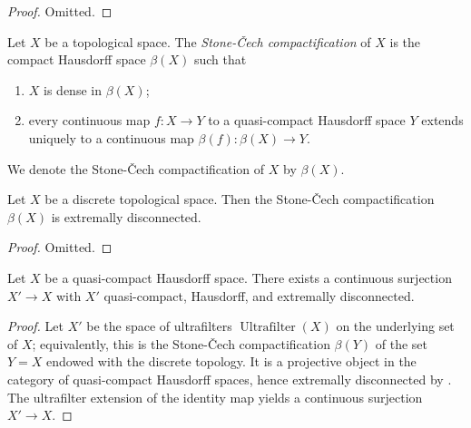 \begin{proof}
  \mathlibok
  \leanok
  Omitted.
\end{proof}

\begin{definition} 
  \label{def:stone-cech-compactification}
  \mathlibok
  \leanok
  Let \(X\) be a topological space. The \emph{Stone-Čech compactification} of \(X\) is the
  compact Hausdorff space \(\beta(X)\) such that
  \begin{enumerate}
    \item \(X\) is dense in \(\beta(X)\);
    \item every continuous map \(f: X \to Y\) to a quasi-compact Hausdorff space \(Y\)
        extends uniquely to a continuous map \(\beta(f): \beta(X) \to Y\).
  \end{enumerate}
  We denote the Stone-Čech compactification of \(X\) by \(\beta(X)\).
\end{definition}

\begin{theorem}
    Let \(X\) be a discrete topological space. Then the Stone-Čech compactification \(\beta(X)\) is extremally disconnected.
    \label{thm:stone-cech-extremally-disconnected}
    \mathlibok
    \leanok
\end{theorem}

\begin{proof}
  \mathlibok
  \leanok
  Omitted.
\end{proof}

\begin{proposition}
  Let $X$ be a quasi-compact Hausdorff space. There exists a continuous surjection $X' \to X$ with $X'$ quasi-compact, Hausdorff, and extremally disconnected.
  \label{thm:extremally-disconnected-cover}
  \mathlibok
  \leanok
\end{proposition}

\begin{proof}
  \mathlibok
  \leanok
  Let $X'$ be the space of ultrafilters $\operatorname{Ultrafilter}(X)$ on the underlying set of $X$; equivalently, this is the Stone-Čech compactification $\beta(Y)$ of the set $Y = X$ endowed with the discrete topology. It is a projective object in the category of quasi-compact Hausdorff spaces, hence extremally disconnected by . The ultrafilter extension of the identity map yields a continuous surjection $X' \to X$.
\end{proof}

